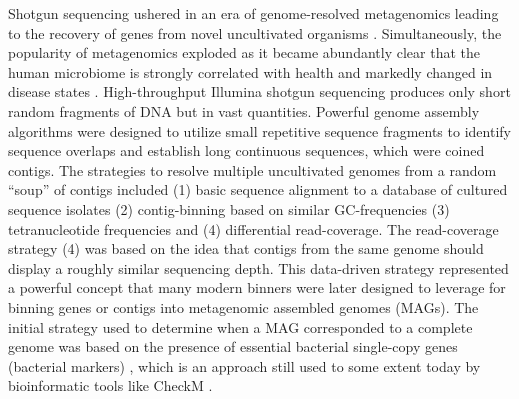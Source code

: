 Shotgun sequencing ushered in an era of genome-resolved metagenomics leading to the recovery of genes from novel uncultivated organisms \cite{Venter2004-ce}. Simultaneously, the popularity of metagenomics exploded as it became abundantly clear that the human microbiome is strongly correlated with health and markedly changed in disease states \cite{Lloyd-Price2016-qf}. High-throughput Illumina shotgun sequencing produces only short random fragments of DNA but in vast quantities. Powerful genome assembly algorithms were designed to utilize small repetitive sequence fragments to identify sequence overlaps and establish long continuous sequences, which were coined contigs. The strategies to resolve multiple uncultivated genomes from a random “soup” of contigs included (1) basic sequence alignment to a database of cultured sequence isolates (2) contig-binning based on similar GC-frequencies (3) tetranucleotide frequencies and (4) differential read-coverage. The read-coverage strategy (4) was based on the idea that contigs from the same genome should display a roughly similar sequencing depth. This data-driven strategy represented a powerful concept that many modern binners were later designed to leverage for binning genes or contigs into metagenomic assembled genomes (MAGs)\cite{Albertsen2013-en,Nielsen2014-vu,Kang2019-su}. The initial strategy used to determine when a MAG corresponded to a complete genome was based on the presence of essential bacterial single-copy genes (bacterial markers) \cite{Albertsen2013-en}, which is an approach still used to some extent today by bioinformatic tools like CheckM \cite{Parks2015-cs}.\\

